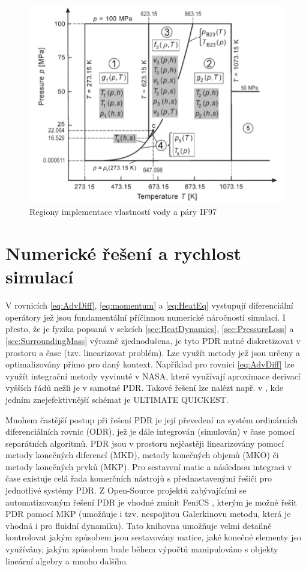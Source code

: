 \begin{figure}[h] \centering \capstart
  \includegraphics[scale=0.7]{figures/IF97}
  \caption{Regiony implementace vlastností vody a páry IF97 \cite{IAPWS2007}}
  \label{fig:IF97}
\end{figure}

\section{Numerické řešení a rychlost simulací}
\label{sec:NumSpeed}
V rovnicích \ref{eq:AdvDiff}, \ref{eq:momentum} a \ref{eq:HeatEq} vystupují
diferenciální operátory jež jsou fundamentální příčinnou numerické náročnosti
simulací. I přesto, že je fyzika popsaná v sekcích \ref{sec:HeatDynamics},
\ref{sec:PressureLoss} a \ref{sec:SurroundingMass} výrazně zjednodušena, je
tyto PDR nutné diskretizovat v prostoru a čase (tzv. linearizovat problém). Lze
využít metody jež jsou určeny a optimalizovány přímo pro daný kontext.
Například pro rovnici \ref{eq:AdvDiff} lze využít integrační metody vyvinuté v
NASA, které využívají aproximace derivací vyšších řádů nežli je v samotné PDR.
Takové řešení lze nalézt např. v \cite{leonard1988}, kde jedním
znejefektivnější schémat je ULTIMATE QUICKEST.

Mnohem častější postup při řešení PDR je její převedení na systém ordinárních
diferenciálních rovnic (ODR), jež je dále integrován (simulován) v čase pomocí
separátních algoritmů. PDR jsou v prostoru nejčastěji linearizovány pomocí
metody konečných diferencí (MKD), metody konečných objemů (MKO) či metody
konečných prvků (MKP). Pro sestavení matic a následnou integraci v čase
existuje celá řada komerčních nástrojů s přednastavenými řešiči pro jednotlivé
systémy PDR. Z Open-Source projektů zabývajícími se automatizovaným řešení PDR
je vhodné zmínit FeniCS \cite{AlnaesBlechta2015a}, kterým je možné řešit PDR pomocí
MKP (umožňuje i tzv. nespojitou Galerkinovu metodu, která je vhodná i pro
fluidní dynamiku). Tato knihovna umožňuje velmi detailně kontrolovat jakým
způsobem jsou sestavovány matice, jaké konečné elementy jso využívány, jakým
způsobem bude během výpočtů manipulováno s objekty lineární algebry a mnoho
dalšího.

